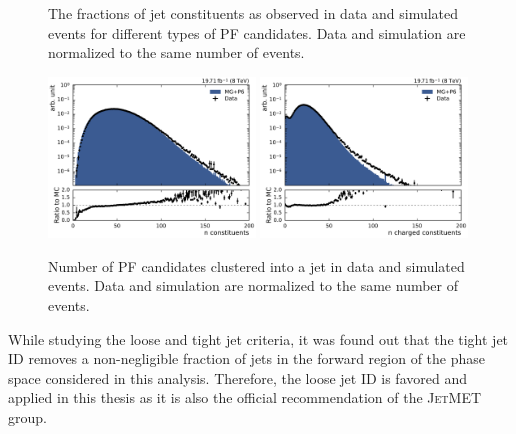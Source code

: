 \begin{figure}[htbp]
    \caption[PF candidate fractions in jets]{The fractions of jet constituents as
            observed in data and simulated events for different types of PF candidates.
            Data and simulation are normalized to the same number of events.}
    \label{fig:jet_constituents_fractions}
\end{figure}

\begin{figure}[htbp]
    \centering
    \includegraphics[width=0.49\textwidth]{figures/measurement/jet_constituent_nConstituents.pdf}\hfill
    \includegraphics[width=0.49\textwidth]{figures/measurement/jet_constituent_nCharged.pdf}
    \caption[Number of particle candidates in jets]{Number of PF candidates
             clustered into a jet in data and simulated events. Data and simulation are
             normalized to the same number of events.}
    \label{fig:jet_constituents_counts}
\end{figure}

While studying the loose and tight jet criteria, it was found out that the tight jet
ID removes a non-negligible fraction of jets in the forward region of the
phase space considered in this analysis. Therefore, the loose jet ID is favored
and applied in this thesis as it is also the official recommendation of the
\textsc{JetMET} group.

